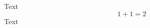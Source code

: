 \documentclass{article}
\begin{document}
Text
\begin{equation}
1+1=2
\end{equation}
Text
\end{document}
